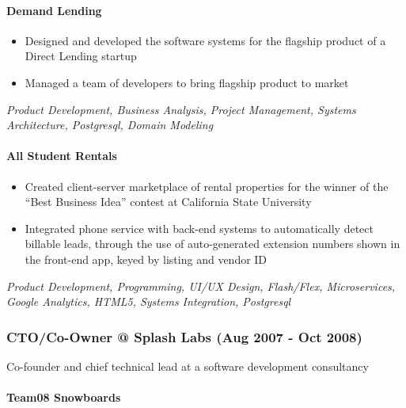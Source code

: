 \hypertarget{demand-lending}{%
\paragraph{Demand Lending}\label{demand-lending}}

\begin{itemize}
\tightlist
\item
  Designed and developed the software systems for the flagship product
  of a Direct Lending startup
\item
  Managed a team of developers to bring flagship product to market
\end{itemize}

\emph{Product Development, Business Analysis, Project Management,
Systems Architecture, Postgresql, Domain Modeling}

\hypertarget{all-student-rentals}{%
\paragraph{All Student Rentals}\label{all-student-rentals}}

\begin{itemize}
\tightlist
\item
  Created client-server marketplace of rental properties for the winner
  of the ``Best Business Idea'' contest at California State University
\item
  Integrated phone service with back-end systems to automatically detect
  billable leads, through the use of auto-generated extension numbers
  shown in the front-end app, keyed by listing and vendor ID
\end{itemize}

\emph{Product Development, Programming, UI/UX Design, Flash/Flex,
Microservices, Google Analytics, HTML5, Systems Integration, Postgresql}

\hypertarget{ctoco-owner-splash-labs-aug-2007---oct-2008}{%
\subsubsection{CTO/Co-Owner @ Splash Labs (Aug 2007 - Oct
2008)}\label{ctoco-owner-splash-labs-aug-2007---oct-2008}}

Co-founder and chief technical lead at a software development
consultancy

\hypertarget{team08-snowboards}{%
\paragraph{Team08 Snowboards}\label{team08-snowboards}}

